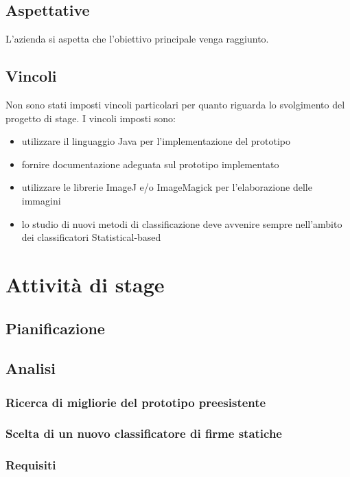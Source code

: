 \subsection{Aspettative}
\label{2.3}
L'azienda si aspetta che l'obiettivo principale venga raggiunto.
\subsection{Vincoli}
\label{2.4}
Non sono stati imposti vincoli particolari per quanto riguarda lo svolgimento del progetto di stage. I vincoli imposti sono:
\begin{itemize}
\item utilizzare il linguaggio Java per l'implementazione del prototipo
\item fornire documentazione adeguata sul prototipo implementato
\item utilizzare le librerie ImageJ e/o ImageMagick per l'elaborazione delle immagini
\item lo studio di nuovi metodi di classificazione deve avvenire sempre nell'ambito dei classificatori Statistical-based
\end{itemize}

\newpage

\section{Attività di stage}
\label{3.0}

\subsection{Pianificazione}
\label{3.1}

\subsection{Analisi}
\label{3.2}

\subsubsection{Ricerca di migliorie del prototipo preesistente}
\label{3.2.1}

\subsubsection{Scelta di un nuovo classificatore di firme statiche}
\label{3.2.2}

\subsubsection{Requisiti}
\label{3.2.3}


